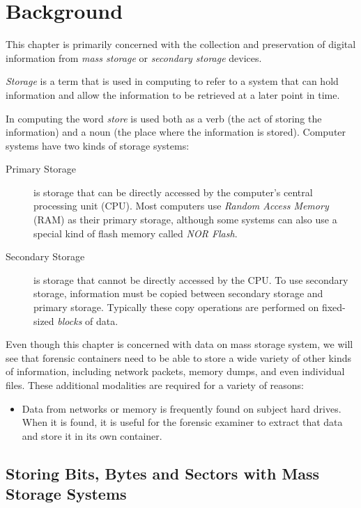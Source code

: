 \section{Background}

This chapter is primarily concerned  with the collection and preservation of
digital information from \emph{mass storage} or \emph{secondary
  storage} devices. 

\emph{Storage} is a term that is used in computing to refer to a
system that can hold information and allow the information to be
retrieved at a later point in time. 

In computing the word \emph{store}
is used both as a verb (the act of storing the information) and a noun
(the place where the information is stored). Computer systems have two
kinds of storage systems:

\begin{description}
\item[Primary Storage] is storage that can be directly accessed by the
  computer's central processing unit (CPU). Most computers use
  \emph{Random Access Memory} (RAM) as their primary storage, although
  some systems can also use a special kind of flash memory called
  \emph{NOR Flash}. 

\item[Secondary Storage] is storage that cannot be directly accessed
  by the CPU. To use secondary storage, information must be copied
  between secondary storage and primary storage. Typically these copy
  operations are performed on fixed-sized \emph{blocks} of data.
\end{description}

Even though this chapter is concerned with data on mass
storage system, we will see that forensic containers need to be able
to store a wide variety of other kinds of information, including
network packets, memory dumps, and even individual files. These
additional modalities are required for a variety of reasons:

\begin{itemize}
\item Data from networks or memory is frequently found on subject hard
  drives. When it is found, it is useful for the forensic examiner to
  extract that data and store it in its own container. 
\end{itemize}

\subsection{Storing Bits, Bytes and Sectors with Mass Storage Systems}

